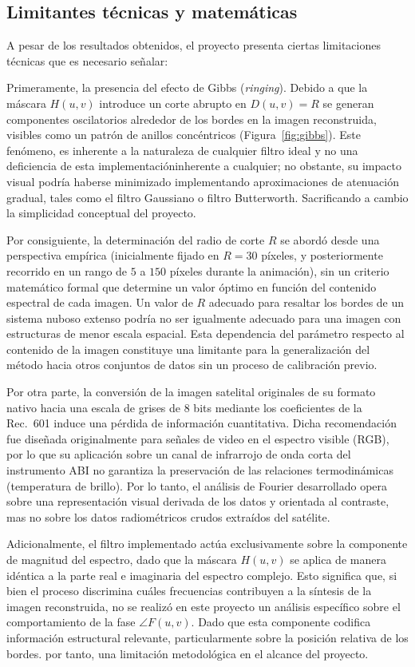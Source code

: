 \documentclass[conference]{IEEEtran}
\begin{document}
\subsection{Limitantes técnicas y matemáticas}

A pesar de los resultados obtenidos, el proyecto presenta ciertas limitaciones técnicas que es necesario señalar:

Primeramente, la presencia del efecto de Gibbs (\textit{ringing}). Debido a que la máscara $H(u,v)$ introduce un corte abrupto en $D(u,v) = R$ se generan componentes oscilatorios alrededor de los bordes en la imagen reconstruida, visibles como un patrón de anillos
concéntricos (Figura~\ref{fig:gibbs}). Este fenómeno, es inherente a la naturaleza de cualquier filtro ideal y no una deficiencia de esta implementacióninherente a cualquier; no obstante, su impacto visual podría haberse minimizado implementando aproximaciones de atenuación gradual, tales como el filtro Gaussiano o filtro Butterworth. Sacrificando a cambio la simplicidad conceptual del proyecto.

Por consiguiente, la determinación del radio de corte $R$ se abordó desde una perspectiva empírica (inicialmente fijado en $R = 30$ píxeles, y posteriormente recorrido
en un rango de $5$ a $150$ píxeles durante la animación), sin un criterio
matemático formal que determine un valor óptimo en función del contenido
espectral de cada imagen. Un valor de $R$ adecuado para resaltar
los bordes de un sistema nuboso extenso podría no ser igualmente adecuado
para una imagen con estructuras de menor escala espacial. Esta dependencia
del parámetro respecto al contenido de la imagen constituye una limitante
para la generalización del método hacia otros conjuntos de datos sin un proceso de calibración previo.

Por otra parte, la conversión de la imagen satelital originales de su formato nativo hacia una escala de grises de 8 bits mediante los coeficientes de la
Rec.~601 induce una pérdida de información cuantitativa. Dicha recomendación fue
diseñada originalmente para señales de video en el espectro visible (RGB), por lo que su aplicación sobre un canal de infrarrojo de onda corta del instrumento ABI no garantiza la preservación de las relaciones
termodinámicas (temperatura de brillo). Por lo tanto, el análisis de Fourier desarrollado opera sobre una representación
visual derivada de los datos y orientada al contraste, mas no sobre los datos radiométricos crudos extraídos del satélite.

Adicionalmente, el filtro implementado actúa exclusivamente sobre la
componente de magnitud del espectro, dado que la máscara $H(u,v)$ se aplica
de manera idéntica a la parte real e imaginaria del espectro complejo. Esto
significa que, si bien el proceso discrimina cuáles frecuencias contribuyen a la síntesis de la imagen reconstruida, no se realizó en este proyecto un análisis específico sobre el comportamiento de la fase $\angle F(u,v)$. Dado que esta componente codifica información estructural relevante, particularmente sobre la posición
relativa de los bordes. por tanto, una limitación metodológica en el alcance del proyecto.
\end{document}
